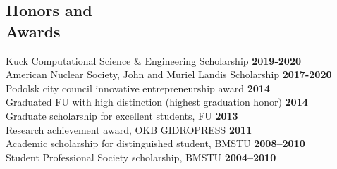 \documentclass[margin,line]{resume}
\begin{document}
\begin{resume}
	\section{\mysidestyle Honors and\\Awards}
	Kuck Computational Science \& Engineering Scholarship\hfill 
	\textbf{2019-2020}\vspace{.5mm}\\%
	American Nuclear Society, John and Muriel Landis Scholarship\hfill 
	\textbf{2017-2020}\vspace{.5mm}\\%
	Podolsk city council innovative entrepreneurship award\hfill 
	\textbf{2014}\vspace{.5mm}\\%
	Graduated FU with high distinction (highest graduation 
	honor)                \hfill \textbf{2014}\vspace{.5mm}\\%
	Graduate scholarship for excellent students, 
	FU                       	\hfill \textbf{2013}\vspace{.5mm}\\%
	Research achievement award, OKB 
	GIDROPRESS                                   
	\hfill\textbf{2011}\vspace{.5mm}\\%
	Academic scholarship for distinguished student, 
	BMSTU		                 \hfill\textbf{2008--2010}\vspace{.5mm}\\%
	Student Professional Society scholarship, 
	BMSTU                                \hfill\textbf{2004--2010}%
 

\end{resume}
\end{document}
